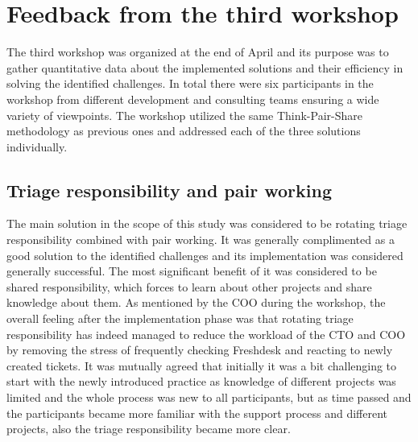 \section{Feedback from the third workshop}

The third workshop was organized at the end of April and its purpose was to gather quantitative data about the implemented solutions and their efficiency in solving the identified challenges.
In total there were six participants in the workshop from different development and consulting teams ensuring a wide variety of viewpoints. The workshop utilized the same
Think-Pair-Share methodology as previous ones and addressed
each of the three solutions individually.

\subsection{Triage responsibility and pair working}

The main solution in the scope of this study was considered to be rotating triage responsibility combined with pair working. It was generally complimented as a good solution to the identified challenges
and its implementation was considered generally successful. The most significant benefit of it was considered to be shared responsibility, which forces to learn about other projects and share knowledge about them.
As mentioned by the COO during the workshop, the overall feeling after the implementation phase was that rotating triage responsibility has indeed managed to reduce the workload of the CTO and COO by removing
the stress of frequently checking Freshdesk and reacting to newly created tickets. It was mutually agreed that initially it was a bit challenging to start with the newly introduced practice as knowledge
of different projects was limited and the whole process was new to all participants, but as time passed and the participants became more familiar with the support process and different projects,
also the triage responsibility became more clear.

